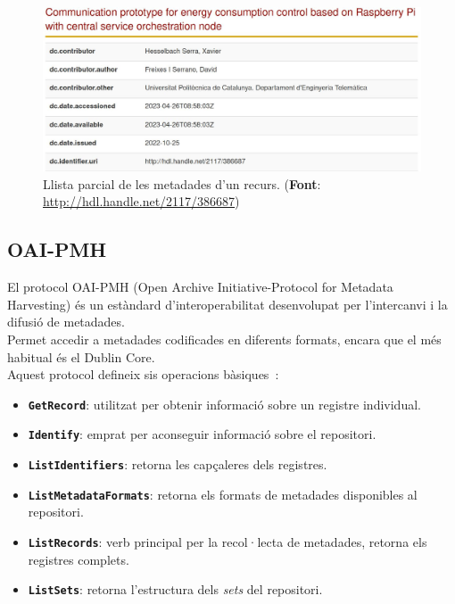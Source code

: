 \begin{figure}[htbp]
    \centerline{\includegraphics[width=\textwidth]{figures/metadata-example}}
    \captionsetup{justification=centering}
    \caption[Llista parcial de les metadades d'un recurs.]{Llista parcial de les metadades d'un recurs. (\textbf{Font}: \url{http://hdl.handle.net/2117/386687})}\label{fig:metadata-example}
\end{figure}

\clearpage

\subsection{\gls{OAI-PMH}}\label{subsec:oai-pmh}

El protocol \gls{OAI-PMH} (Open Archive Initiative-Protocol for Metadata Harvesting) és un estàndard d'interoperabilitat desenvolupat per l'intercanvi i la difusió de metadades. \\

\noindent
Permet accedir a metadades codificades en diferents formats, encara que el més habitual és el Dublin Core. \\

\noindent
Aquest protocol defineix sis operacions bàsiques~\cite{oai-pmh}:

\begin{itemize}
    \item \textbf{\texttt{GetRecord}}: utilitzat per obtenir informació sobre un registre individual.
    \item \texttt{\textbf{Identify}}: emprat per aconseguir informació sobre el repositori.
    \item \texttt{\textbf{ListIdentifiers}}: retorna les capçaleres dels registres.
    \item \texttt{\textbf{ListMetadataFormats}}: retorna els formats de metadades disponibles al repositori.
    \item \texttt{\textbf{ListRecords}}: verb principal per la recol·lecta de metadades, retorna els registres complets.
    \item \texttt{\textbf{ListSets}}: retorna l’estructura dels \textit{sets} del repositori.
\end{itemize}

